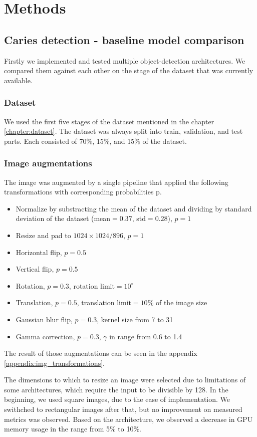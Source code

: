 \chapter{Methods}

\section{Caries detection - baseline model comparison}
\label{sec:caries_detection}

Firstly we implemented and tested multiple object-detection architectures. We compared them against each other on the stage of the dataset that was currently available.

\subsection{Dataset}
We used the first five stages of the dataset mentioned in the chapter \ref{chapter:dataset}. The dataset was always split into train, validation, and test parts. Each consisted of 70\%, 15\%, and 15\% of the dataset.

\subsection{Image augmentations}
The image was augmented by a single pipeline that applied the following transformations with corresponding probabilities p.
\begin{itemize}
    \item Normalize by substracting the mean of the dataset and dividing by standard deviation of the dataset (mean$=0.37$, std$=0.28$), $p=1$
    \item Resize and pad to $1024\times1024/896$, $p=1$
    \item Horizontal flip, $p=0.5$
    \item Vertical flip, $p=0.5$
    \item Rotation, $p=0.3$, rotation limit$=10^{\circ}$
    \item Translation, $p=0.5$, translation limit$=10\%$ of the image size
    \item Gaussian blur flip, $p=0.3$, kernel size from 7 to 31
    \item Gamma correction, $p=0.3$, $\gamma$ in range from 0.6 to 1.4
\end{itemize}
The result of those augmentations can be seen in the appendix \ref{appendix:img_transformations}.

The dimensions to which to resize an image were selected due to limitations of some architectures, which require the input to be divisible by 128. In the beginning, we used square images, due to the ease of implementation. We swithched to rectangular images after that, but no improvement on measured metrics was observed. Based on the architecture, we observed a decrease in GPU memory usage in the range from 5\% to 10\%.

